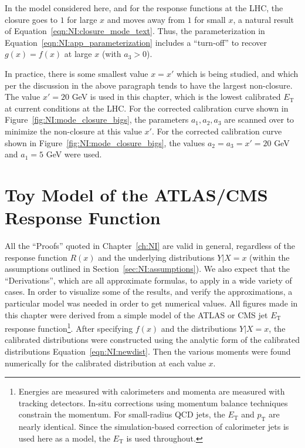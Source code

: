In the model considered here, and for the response functions at the LHC, the closure goes to $1$ for large $x$ and moves away from $1$ for small $x$, a natural result of Equation~\ref{eqn:NI:closure_mode_text}. Thus, the parameterization in Equation~\ref{eqn:NI:app_parameterization} includes a ``turn-off'' to recover $g(x)=f(x)$ at large $x$ (with $a_3>0$).

In practice, there is some smallest value $x=x'$ which is being studied, and which per the discussion in the above paragraph tends to have the largest non-closure. The value $x'=20$ GeV is used in this chapter, which is the lowest calibrated $E_\text{T}$ at current conditions at the LHC. For the corrected calibration curve shown in Figure~\ref{fig:NI:mode_closure_bigs}, the parameters $a_1,a_2,a_3$ are scanned over to minimize the non-closure at this value $x'$. For the corrected calibration curve shown in Figure~\ref{fig:NI:mode_closure_bigs}, the values $a_2=a_3=x'=20$ GeV and $a_1 = 5$ GeV were used.

\clearpage
\newpage
\section{Toy Model of the ATLAS/CMS Response Function}
\label{sec:NI:toy_model}
All the ``Proofs'' quoted in Chapter~\ref{ch:NI} are valid in general, regardless of the response function $R(x)$ and the underlying distributions $Y|X=x$ (within the assumptions outlined in Section~\ref{sec:NI:assumptions}). We also expect that the ``Derivations'', which are all approximate formulas, to apply in a wide variety of cases. In order to visualize some of the results, and verify the approximations, a particular model was needed in order to get numerical values. All figures made in this chapter were derived from a simple model of the ATLAS or CMS jet $E_\text{T}$ response function\footnote{Energies are measured with calorimeters and momenta are measured with tracking detectors.  In-situ corrections using momentum balance techniques constrain the momentum.  For small-radius QCD jets, the $E_\text{T}$ and $p_\text{T}$ are nearly identical.  Since the simulation-based correction of calorimeter jets is used here as a model, the $E_\text{T}$ is used throughout. }. After specifying $f(x)$ and the distributions $Y|X=x$, the calibrated distributions were constructed using the analytic form of the calibrated distributions Equation~\ref{eqn:NI:newdist}. Then the various moments were found numerically for the calibrated distribution at each value $x$.

